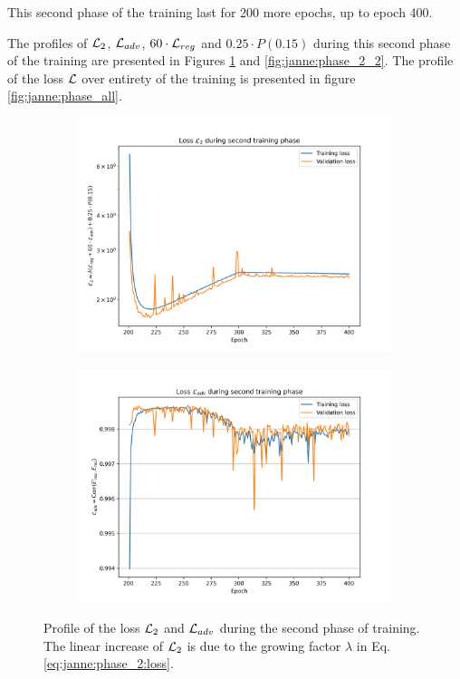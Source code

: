 \documentclass[../main.tex]{subfiles}
\begin{document}
This second phase of the training last for 200 more epochs, up to epoch 400.

The profiles of ${\cal L}_2$, ${\cal L}_{adv}$, $60 \cdot {\cal L}_{reg}$ and $0.25 \cdot P(0.15)$ during this second phase of the training are presented in Figures \ref{fig:janne:phase_2_1} and \ref{fig:janne:phase_2_2}. The profile of the loss ${\cal L}$ over entirety of the training is presented in figure \ref{fig:janne:phase_all}.

\begin{figure}[ht]
  \centering
  \begin{subfigure}[t]{0.48\linewidth}
    \includegraphics[width=\linewidth]{images/janne/training/phase_2_loss.png}
  \end{subfigure}
  \hfill
  \begin{subfigure}[t]{0.48\linewidth}
    \includegraphics[width=\linewidth]{images/janne/training/phase_2_loss_adv.png}
  \end{subfigure}
  \caption{Profile of the loss ${\cal L}_2$ and ${\cal L}_{adv}$ during the second phase of training. The linear increase of ${\cal L}_2$ is due to the growing factor $\lambda$ in Eq. \ref{eq:janne:phase_2:loss}.}
  \label{fig:janne:phase_2_1}
\end{figure}
\end{document}
